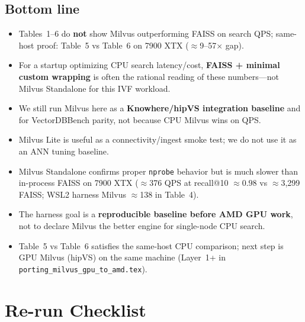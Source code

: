 \documentclass[11pt,a4paper]{article}
\begin{document}
\subsection{Bottom line}

\begin{itemize}[leftmargin=*]
  \item Tables~1--6 do \textbf{not} show Milvus outperforming FAISS on search QPS; same-host
        proof: Table~5 vs Table~6 on 7900 XTX ($\approx$9--57$\times$ gap).
  \item For a startup optimizing CPU search latency/cost, \textbf{FAISS + minimal custom
        wrapping} is often the rational reading of these numbers---not Milvus Standalone for
        this IVF workload.
  \item We still run Milvus here as a \textbf{Knowhere/hipVS integration baseline} and for
        VectorDBBench parity, not because CPU Milvus wins on QPS.
  \item Milvus Lite is useful as a connectivity/ingest smoke test; we do not use it as an ANN tuning
        baseline.
  \item Milvus Standalone confirms proper \texttt{nprobe} behavior but is much slower than
        in-process FAISS on 7900 XTX ($\approx$376 QPS at recall@10 $\approx 0.98$ vs
        $\approx$3{,}299 FAISS; WSL2 harness Milvus $\approx$138 in Table~4).
  \item The harness goal is a \textbf{reproducible baseline before AMD GPU work}, not to
        declare Milvus the better engine for single-node CPU search.
  \item Table~5 vs Table~6 satisfies the same-host CPU comparison; next step is GPU Milvus
        (hipVS) on the same machine (Layer~1+ in \texttt{porting\_milvus\_gpu\_to\_amd.tex}).
\end{itemize}

\section{Re-run Checklist}
\end{document}
